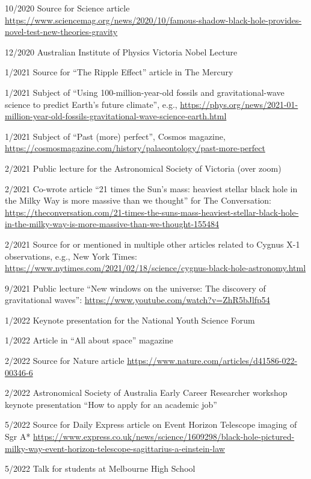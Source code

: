 \documentclass[margin,line]{res}
\begin{document}
\begin{resume}
10/2020	Source for Science article \url{https://www.sciencemag.org/news/2020/10/famous-shadow-black-hole-provides-novel-test-new-theories-gravity}
	  
12/2020	Australian Institute of Physics Victoria Nobel Lecture

1/2021	Source for ``The Ripple Effect'' article in The Mercury

1/2021 	Subject of ``Using 100-million-year-old fossils and gravitational-wave science to predict Earth's future climate'', e.g., \url{https://phys.org/news/2021-01-million-year-old-fossils-gravitational-wave-science-earth.html}

1/2021	Subject of ``Past (more) perfect'', Cosmos magazine, \url{https://cosmosmagazine.com/history/palaeontology/past-more-perfect}

2/2021 	Public lecture for the Astronomical Society of Victoria (over zoom)

2/2021 	Co-wrote article ``21 times the Sun's mass: heaviest stellar black hole in the Milky Way is more massive than we thought'' for The Conversation: \url{https://theconversation.com/21-times-the-suns-mass-heaviest-stellar-black-hole-in-the-milky-way-is-more-massive-than-we-thought-155484}

2/2021	Source for or mentioned in multiple other articles related to Cygnus X-1 observations, e.g., New York Times: \url{https://www.nytimes.com/2021/02/18/science/cygnus-black-hole-astronomy.html}
	  
9/2021	Public lecture ``New windows on the universe: The discovery of gravitational waves'': \url{https://www.youtube.com/watch?v=ZhR5bJlfp54}

1/2022	Keynote presentation for the National Youth Science Forum

1/2022	Article in ``All about space'' magazine
	  
2/2022  	Source for Nature article \url{https://www.nature.com/articles/d41586-022-00346-6}

2/2022	Astronomical Society of Australia Early Career Researcher workshop keynote presentation ``How to apply for an academic job'' 

5/2022	Source for Daily Express article on Event Horizon Telescope imaging of Sgr A* \url{https://www.express.co.uk/news/science/1609298/black-hole-pictured-milky-way-event-horizon-telescope-sagittarius-a-einstein-law}

5/2022	Talk for students at Melbourne High School
	  
\end{resume}
\end{document}
